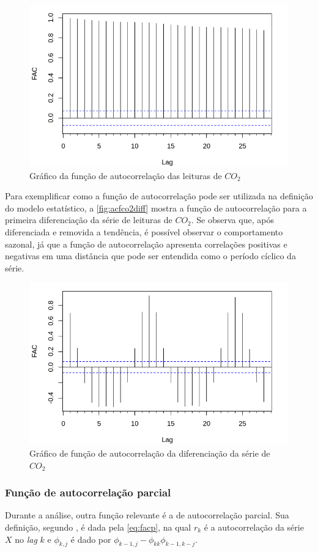 \documentclass[
    12pt,
    oneside,
    a4paper,
    english,
    brazil
]{abntex2}
\begin{document}
\begin{figure}[ht]
    \centering
    \caption{Gráfico da função de autocorrelação das leituras de
        $CO_2$}\label{fig:correlogramaCo2}
    \includegraphics[width=.5\linewidth]{images/acf_co2.png}
\end{figure}

Para exemplificar como a função de autocorrelação pode ser utilizada na definição
do modelo estatístico, a  \autoref{fig:acfco2diff} mostra a função  de autocorrelação
para a  primeira diferenciação da série  de leituras de $CO_2$.  Se observa que,
após diferenciada e removida a tendência, é possível observar o comportamento
sazonal, já  que a função  de autocorrelação apresenta correlações  positivas e
negativas em  uma distância que  pode ser entendida  como o período  cíclico da
série.

\begin{figure}[ht]
    \centering
    \caption{Gráfico de função de autocorrelação da diferenciação da série de
        $CO_2$}\label{fig:acfco2diff}
    \includegraphics[width=.5\linewidth]{images/acf_co2_diff.png}
\end{figure}

\subsubsection{Função de autocorrelação parcial}

Durante  a análise,  outra função  relevante  é a de autocorrelação parcial.  Sua
definição, segundo , é dada pela \autoref{eq:facp}, na qual $r_k$ é
a autocorrelação da série $X$  no \textit{lag} $k$  e $\phi_{k,j}$ é  dado por
$\phi_{k-1, j}-\phi_{kk}\phi_{k-1,k-j}$.
\end{document}
